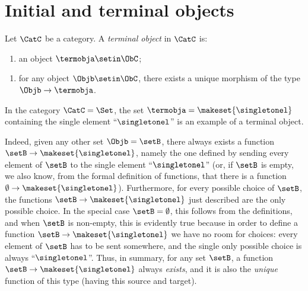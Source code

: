 
\section{Initial and terminal objects}
\label{sec:initional-terminal}




\begin{ctdefinition}
Let $\CatC$ be a category. A \emph{terminal object} in $\CatC$ is: 

\constit
\begin{enumerate}
\item an object $\termobja \setin \ObC$; 
\end{enumerate}
\condit
\begin{enumerate}
\item for any object $\Objb \setin \ObC$, there exists a unique morphism of the type $\Objb \to \termobja$. 
\end{enumerate}
\end{ctdefinition}


\begin{example}\label{exa:terminal-object-in-Set}
In the category $\CatC = \Set$, the set $\termobja = \makeset{ \singletonel}$ containing the single element ``$\singletonel$'' is an example of a terminal object. 

Indeed, given any other set $\Objb = \setB$, there always exists a function $\setB \to \makeset{ \singletonel}$, namely the one defined by sending every element of $\setB$ to the single element ``$\singletonel$'' (or, if $\setB$ is empty, we also know, from the formal definition of functions, that there is a function $\emptyset \to \makeset{ \singletonel}$). Furthermore, for every possible choice of $\setB$, the functions $\setB \to \makeset{ \singletonel}$ just described are the only possible choice. In the special case $\setB = \emptyset$, this follows from the definitions, and when $\setB$ is non-empty, this is evidently true because in order to define a function $\setB \to \makeset{ \singletonel}$ we have no room for choices: every element of $\setB$ has to be sent somewhere, and the single only possible choice is always ``$\singletonel$''. Thus, in summary, for any set $\setB$, a function $\setB \to \makeset{ \singletonel}$ always \emph{exists}, and it is also the \emph{unique} function of this type (having this source and target). 
\end{example}

